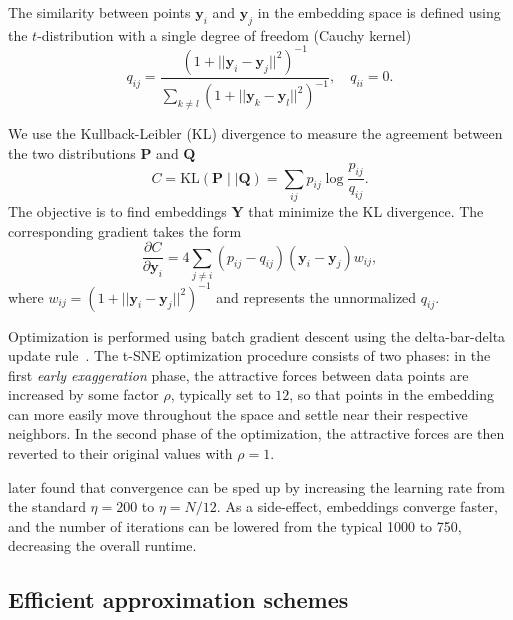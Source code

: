 \documentclass[article]{jss}
\begin{document}
The similarity between points $\mathbf{y}_i$ and $\mathbf{y}_j$ in the embedding
space is defined using the $t$-distribution with a single degree of freedom
(Cauchy kernel)
\begin{equation}
q_{ij} = \frac{\left ( 1 + || \mathbf{y}_i - \mathbf{y}_j ||^2 \right )^{-1}}
{\sum_{k \neq l}\left ( 1 + || \mathbf{y}_k - \mathbf{y}_l ||^2 \right )^{-1}},
\quad q_{ii} = 0.
\label{eq:cauchy_kernel}
\end{equation}

We use the Kullback-Leibler (KL) divergence to measure the agreement
between the two distributions $\mathbf{P}$ and $\mathbf{Q}$
\begin{equation}
C = \text{KL}(\mathbf{P} \mid \mid \mathbf{Q}) = \sum_{ij} p_{ij} \log \frac{p_{ij}}{q_{ij}}.
\label{eq:kl_divergence}
\end{equation}
The objective is to find embeddings $\mathbf{Y}$ that minimize the KL divergence. The corresponding gradient takes the form
\begin{equation}
\frac{\partial C}{\partial \mathbf{y}_i} = 4 \sum_{j \neq i} \left ( p_{ij} - q_{ij} \right ) \left ( \mathbf{y}_i - \mathbf{y}_j \right ) w_{ij},
\label{eq:tsne_gradient}
\end{equation}
where $w_{ij} = \left ( 1 + || \mathbf{y}_i - \mathbf{y}_j || ^2 \right )^{-1}$
and represents the unnormalized $q_{ij}$.

Optimization is performed using batch gradient descent using the delta-bar-delta update rule~\citep{jacobs1988increased}. The t-SNE optimization procedure consists of two phases: in the first \textit{early exaggeration} phase, the attractive forces between data points are increased by some factor $\rho$, typically set to $12$, so that points in the embedding can more easily move throughout the space and settle near their respective neighbors. In the second phase of the optimization, the attractive forces are then reverted to their original values with $\rho=1$.

\citet{belkina2019automated} later found that convergence can be sped up by
increasing the learning rate from the standard $\eta=200$ to $\eta=N/12$. As a
side-effect, embeddings converge faster, and the number of iterations can be
lowered from the typical 1000 to 750, decreasing the overall runtime.

\subsection{Efficient approximation schemes} \label{sec:meth.approx}
\end{document}
